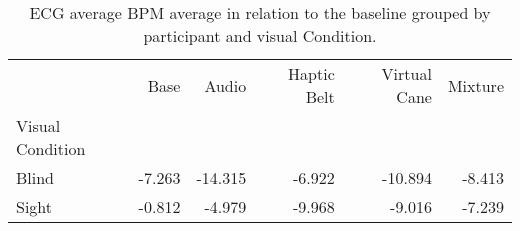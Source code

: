 
\begin{table}[!htb]
\centering
\caption{ECG average BPM average in relation to the baseline grouped by participant and visual Condition.}
\label{tab:ecg_bpm_average_group}
\begin{tabular}{lrrrrr}
\toprule
{} &   Base &   Audio &  Haptic Belt &  Virtual Cane &  Mixture \\
Visual Condition &        &         &              &               &          \\
\midrule
Blind            & -7.263 & -14.315 &       -6.922 &       -10.894 &   -8.413 \\
Sight            & -0.812 &  -4.979 &       -9.968 &        -9.016 &   -7.239 \\
\bottomrule
\end{tabular}
\end{table}

